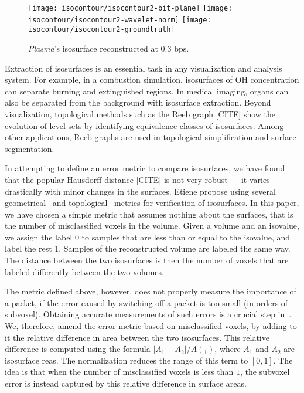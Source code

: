 \begin{figure}[h]
	\centering
	{\texttt{[image: isocontour/isocontour2-bit-plane]}}
	{\texttt{[image: isocontour/isocontour2-wavelet-norm]}}
	{\texttt{[image: isocontour/isocontour2-groundtruth]}}
	\caption{\emph{Plasma}'s isosurface reconstructed at 0.3 bps.}
	\label{fig:isocontour-surfaces-plasma}
\end{figure}

Extraction of isosurfaces is an essential task in any visualization and analysis system. For
example, in a combustion simulation, isosurfaces of OH concentration can separate burning and
extinguished regions. In medical imaging, organs can also be separated from the background with
isosurface extraction. Beyond visualization, topological methods such as the Reeb graph [CITE] show the
evolution of level sets by identifying equivalence classes of isosurfaces. Among other applications,
Reeb graphs are used in topological simplification and surface segmentation.

In attempting to define an error metric to compare isosurfaces, we have found that the popular
Hausdorff distance [CITE] is not very robust --- it varies drastically with minor changes in the
surfaces. Etiene \etal propose using several geometrical~\cite{verifiable-isosurface} and
topological~\cite{topology-verification-isosurface} metrics for verification of isosurfaces. In this
paper, we have chosen a simple metric that assumes nothing about the surfaces, that is the number of
misclassified voxels in the volume. Given a volume and an isovalue, we assign the label 0 to samples
that are less than or equal to the isovalue, and label the rest 1. Samples of the reconstructed
volume are labeled the same way. The distance between the two isosurfaces is then the number of
voxels that are labeled differently between the two volumes.

The metric defined above, however, does not properly measure the importance of a packet, if the
error caused by switching off a packet is too small (in orders of subvoxel). Obtaining accurate
measurements of such errors is a crucial step in~. We, therefore, amend the
error metric based on misclassified voxels, by adding to it the relative difference in area between
the two isosurfaces. This relative difference is computed using the formula $|A_1-A_2|/A(_1)$, where
$A_1$ and $A_2$ are isosurface reas. The normalization reduces the range of this term to $[0, 1]$.
The idea is that when the number of misclassified voxels is less than $1$, the subvoxel error is
instead captured by this relative difference in surface areas.

